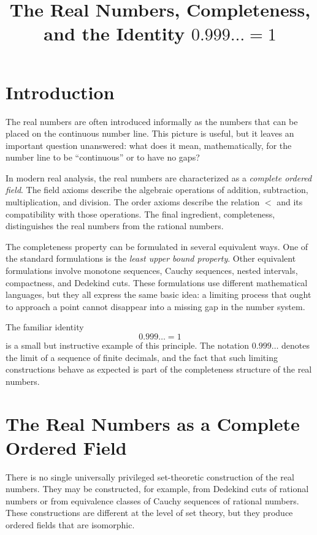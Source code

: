\documentclass{essay}
\title{The Real Numbers, Completeness, and the Identity \(0.999\ldots = 1\)}
\author{}
\date{}
\begin{document}
\maketitle
\tableofcontents

\section{Introduction}

The real numbers are often introduced informally as the numbers that can be placed on the continuous number line. This picture is useful, but it leaves an important question unanswered: what does it mean, mathematically, for the number line to be ``continuous'' or to have no gaps?

In modern real analysis, the real numbers are characterized as a \emph{complete ordered field}. The field axioms describe the algebraic operations of addition, subtraction, multiplication, and division. The order axioms describe the relation \(<\) and its compatibility with those operations. The final ingredient, completeness, distinguishes the real numbers from the rational numbers.

The completeness property can be formulated in several equivalent ways. One of the standard formulations is the \emph{least upper bound property}. Other equivalent formulations involve monotone sequences, Cauchy sequences, nested intervals, compactness, and Dedekind cuts. These formulations use different mathematical languages, but they all express the same basic idea: a limiting process that ought to approach a point cannot disappear into a missing gap in the number system.

The familiar identity
\[ 0.999\ldots = 1 \]
is a small but instructive example of this principle. The notation \(0.999\ldots\) denotes the limit of a sequence of finite decimals, and the fact that such limiting constructions behave as expected is part of the completeness structure of the real numbers.

\section{The Real Numbers as a Complete Ordered Field}

There is no single universally privileged set-theoretic construction of the real numbers. They may be constructed, for example, from Dedekind cuts of rational numbers or from equivalence classes of Cauchy sequences of rational numbers. These constructions are different at the level of set theory, but they produce ordered fields that are isomorphic.
\end{document}
